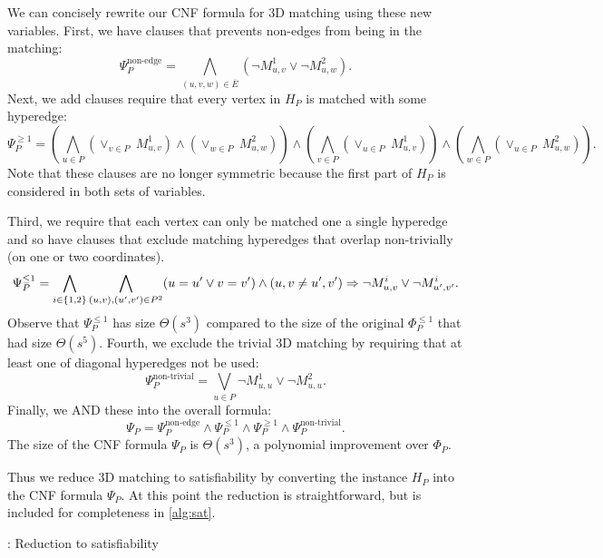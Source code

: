 \documentclass[11pt]{article}
\begin{document}
We can concisely rewrite our CNF formula for 3D matching using these
new variables.  First, we have clauses that prevents non-edges from
being in the matching:
\begin{equation}
  \Psi_P^{\text{non-edge}} = \bigwedge_{(u,v,w) \in \overline{E}}
  (\neg M_{u,v}^1 \vee \neg M_{u,w}^2).
\end{equation}
Next, we add clauses require that every vertex in $H_P$ is matched with some
hyperedge:
\begin{equation}
  \Psi_P^{\ge 1} =
  \left(\bigwedge_{u \in P} (\vee_{v\in P} ~M_{u,v}^1) \wedge (\vee_{w \in P} ~M_{u,w}^2)\right)
  \wedge \left(\bigwedge_{v \in P} (\vee_{u \in P} ~M_{u,v}^1)\right)
  \wedge \left(\bigwedge_{w \in P} (\vee_{u \in P} ~M_{u,w}^2)\right).
\end{equation}
Note that these clauses are no longer symmetric because the first part
of $H_P$ is considered in both sets of variables.

Third, we require that each vertex can only be matched one a single
hyperedge and so have clauses that exclude matching hyperedges that
overlap non-trivially (on one or two coordinates).
\begin{equation}
  \Psi_P^{\le 1} = \bigwedge_{i \in \left\{ 1,2 \right\}} \bigwedge_{(u,v),
    (u',v') \in P^2} (u = u' \vee v = v') \wedge (u,v \neq u',v')
  \Rightarrow \neg M_{u,v}^i \vee \neg M_{u',v'}^i.
\end{equation}
Observe that $\Psi_P^{\le 1}$ has size $\Theta(s^3)$ compared to the
size of the original $\Phi_P^{\le 1}$ that had size $\Theta(s^5)$.
Fourth, we exclude the trivial 3D matching by requiring that at least
one of diagonal hyperedges not be used:
\begin{equation}
  \Psi_P^{\text{non-trivial}} = \bigvee_{u \in P} \neg M_{u,u}^1 \vee
  \neg M_{u,u}^2.
\end{equation}
Finally, we AND these into the overall formula:
\begin{equation}
  \Psi_P = \Psi_P^{\text{non-edge}} \wedge \Psi_P^{\le 1} \wedge
  \Psi_P^{\ge 1} \wedge \Psi_P^{\text{non-trivial}}.
\end{equation}
The size of the CNF formula $\Psi_P$ is $\Theta(s^3)$, a polynomial
improvement over $\Phi_P$.

Thus we reduce 3D matching to satisfiability by converting the
instance $H_P$ into the CNF formula $\Psi_P$.  At this point the
reduction is straightforward, but is included for completeness in
\autoref{alg:sat}.

\begin{algorithm}
  \caption{: Reduction to satisfiability}
  \label{alg:sat}
\begin{algorithmic}[1]
  \Else
  \EndIf
  \EndFunction
\end{algorithmic}
\end{algorithm}
\end{document}
